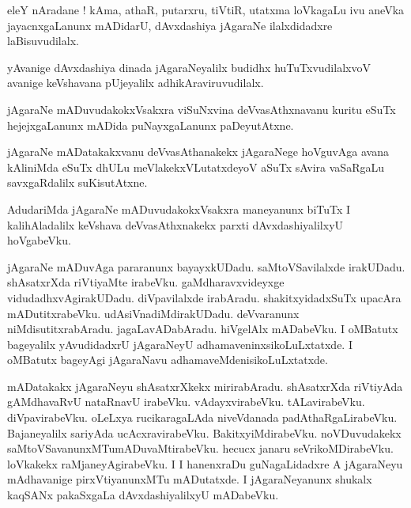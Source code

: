 \documentclass{article}
\begin{document}
\begin{mn}%
eleY nAradane ! kAma, athaR, putarxru, tiVtiR, utatxma loVkagaLu ivu aneVka jayacnxgaLanunx 
mADidarU, dAvxdashiya jAgaraNe ilalxdidadxre laBisuvudilalx.
\end{mn}

\begin{mn}%
yAvanige dAvxdashiya dinada jAgaraNeyalilx budidhx huTuTxvudilalxvoV avanige keVshavana pUjeyalilx 
adhikAraviruvudilalx.
\end{mn}

\begin{mn}%
jAgaraNe mADuvudakokxVsakxra viSuNxvina deVvasAthxnavanu kuritu eSuTx hejejxgaLanunx mADida 
puNayxgaLanunx paDeyutAtxne.
\end{mn}

\begin{mn}%
jAgaraNe mADatakakxvanu deVvasAthanakekx jAgaraNege hoVguvAga avana kAliniMda eSuTx dhULu 
meVlakekxVLutatxdeyoV aSuTx sAvira vaSaRgaLu savxgaRdalilx suKisutAtxne.
\end{mn}

\begin{mn}%
AdudariMda jAgaraNe mADuvudakokxVsakxra maneyanunx biTuTx I kalihAladalilx keVshava 
deVvasAthxnakekx parxti dAvxdashiyalilxyU hoVgabeVku.
\end{mn}

\begin{mn}%
jAgaraNe mADuvAga pararanunx bayayxkUDadu. saMtoVSavilalxde irakUDadu. shAsatxrXda riVtiyaMte 
irabeVku. gaMdharavxvideyxge vidudadhxvAgirakUDadu. diVpavilalxde irabAradu. shakitxyidadxSuTx 
upacAra mADutitxrabeVku. udAsiVnadiMdirakUDadu. deVvaranunx niMdisutitxrabAradu. jagaLavADabAradu. 
hiVgelAlx mADabeVku. I oMBatutx bageyalilx yAvudidadxrU jAgaraNeyU adhamaveninxsikoLuLxtatxde. I 
oMBatutx bageyAgi jAgaraNavu adhamaveMdenisikoLuLxtatxde.
\end{mn}

\begin{mn}%
mADatakakx jAgaraNeyu shAsatxrXkekx mirirabAradu. shAsatxrXda riVtiyAda gAMdhavaRvU nataRnavU 
irabeVku. vAdayxvirabeVku. tALavirabeVku. diVpavirabeVku. oLeLxya rucikaragaLAda niveVdanada 
padAthaRgaLirabeVku. Bajaneyalilx sariyAda ucAcxravirabeVku. BakitxyiMdirabeVku. noVDuvudakekx 
saMtoVSavanunxMTumADuvaMtirabeVku. hecucx janaru seVrikoMDirabeVku. loVkakekx raMjaneyAgirabeVku. 
I I hanenxraDu guNagaLidadxre A jAgaraNeyu mAdhavanige pirxVtiyanunxMTu mADutatxde. I 
jAgaraNeyanunx shukalx kaqSANx pakaSxgaLa dAvxdashiyalilxyU mADabeVku.
\end{mn}
\end{document}
